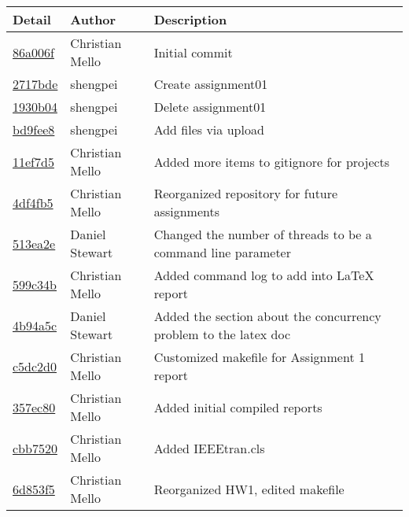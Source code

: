 \begin{tabular}{l l l}\textbf{Detail} & \textbf{Author} & \textbf{Description}\\\hline
\href{https://github.com/Ecksian/CS444/commit/86a006fd30840143e5791dbdd71f31ac83f8c769}{86a006f} & Christian Mello & Initial commit\\\hline
\href{https://github.com/Ecksian/CS444/commit/2717bded0d98d68820efbe68ec43abac7285f325}{2717bde} & shengpei & Create assignment01\\\hline
\href{https://github.com/Ecksian/CS444/commit/1930b0440dfe38b082393a9690d5494a08111fc2}{1930b04} & shengpei & Delete assignment01\\\hline
\href{https://github.com/Ecksian/CS444/commit/bd9fee8044987096e290f57f8deacd12b5ebbdae}{bd9fee8} & shengpei & Add files via upload\\\hline
\href{https://github.com/Ecksian/CS444/commit/11ef7d564639aaf5ca708be7b0f267b68b9a0ed5}{11ef7d5} & Christian Mello & Added more items to gitignore for projects\\\hline
\href{https://github.com/Ecksian/CS444/commit/4df4fb593b21d117951f22a03fb7fc906e0c1c0d}{4df4fb5} & Christian Mello & Reorganized repository for future assignments\\\hline
\href{https://github.com/Ecksian/CS444/commit/513ea2e0d3b9f8acf053066a79e4545116c6d384}{513ea2e} & Daniel Stewart & Changed the number of threads to be a command line parameter\\\hline
\href{https://github.com/Ecksian/CS444/commit/599c34b844d0e4b03ba3ccaa401f85e18178f708}{599c34b} & Christian Mello & Added command log to add into LaTeX report\\\hline
\href{https://github.com/Ecksian/CS444/commit/4b94a5c07d17ea90898b093678602886f585685c}{4b94a5c} & Daniel Stewart & Added the section about the concurrency problem to the latex doc\\\hline
\href{https://github.com/Ecksian/CS444/commit/c5dc2d01f7717b1bfa50629e12722f6f2fb699b1}{c5dc2d0} & Christian Mello & Customized makefile for Assignment 1 report\\\hline
\href{https://github.com/Ecksian/CS444/commit/357ec80984dcac1e7086c1a7c01a580435393520}{357ec80} & Christian Mello & Added initial compiled reports\\\hline
\href{https://github.com/Ecksian/CS444/commit/cbb752038c2d90f3690a5c0fe95528d139d959ec}{cbb7520} & Christian Mello & Added IEEEtran.cls\\\hline
\href{https://github.com/Ecksian/CS444/commit/6d853f5b51a431d95d30b6c75d72a1fea6ffc07e}{6d853f5} & Christian Mello & Reorganized HW1, edited makefile\\\hline

\end{tabular}
